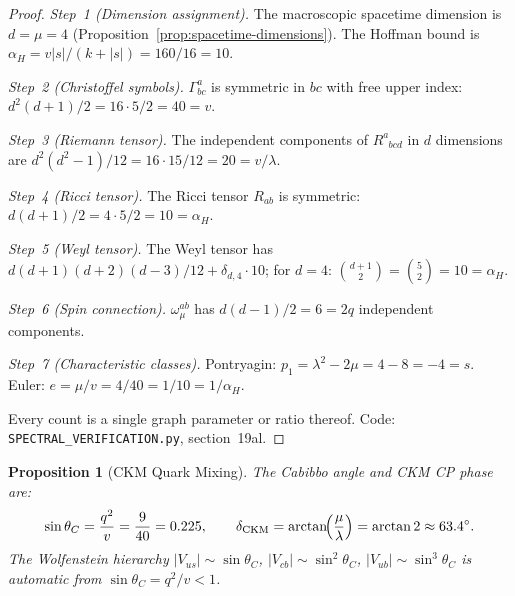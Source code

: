 \documentclass[12pt,a4paper]{article}
\newtheorem{proposition}[theorem]{Proposition}
\begin{document}
\begin{proof}
\emph{Step~1 (Dimension assignment).}
The macroscopic spacetime dimension is $d = \mu = 4$
(Proposition~\ref{prop:spacetime-dimensions}).
The Hoffman bound is $\alpha_H = v|s|/(k+|s|) = 160/16 = 10$.

\emph{Step~2 (Christoffel symbols).}
$\Gamma^a_{bc}$ is symmetric in $bc$ with free upper index:
$d^2(d+1)/2 = 16 \cdot 5/2 = 40 = v$.

\emph{Step~3 (Riemann tensor).}
The independent components of $R^a_{\phantom{a}bcd}$ in $d$ dimensions
are $d^2(d^2-1)/12 = 16 \cdot 15/12 = 20 = v/\lambda$.

\emph{Step~4 (Ricci tensor).}
The Ricci tensor $R_{ab}$ is symmetric:
$d(d+1)/2 = 4 \cdot 5/2 = 10 = \alpha_H$.

\emph{Step~5 (Weyl tensor).}
The Weyl tensor has $d(d+1)(d+2)(d-3)/12 + \delta_{d,4}\cdot 10$;
for $d=4$: $\binom{d+1}{2} = \binom{5}{2} = 10 = \alpha_H$.

\emph{Step~6 (Spin connection).}
$\omega^{ab}_\mu$ has $d(d-1)/2 = 6 = 2q$ independent components.

\emph{Step~7 (Characteristic classes).}
Pontryagin: $p_1 = \lambda^2 - 2\mu = 4 - 8 = -4 = s$.
Euler: $e = \mu/v = 4/40 = 1/10 = 1/\alpha_H$.

Every count is a single graph parameter or ratio thereof.
Code: \texttt{SPECTRAL\_VERIFICATION.py}, section~19al.
\end{proof}


\begin{proposition}[CKM Quark Mixing]\label{prop:ckm}
The Cabibbo angle and CKM CP phase are:
\[
  \sin\theta_C = \frac{q^2}{v} = \frac{9}{40} = 0.225,
  \qquad
  \delta_{\mathrm{CKM}} = \arctan\!\Bigl(\frac{\mu}{\lambda}\Bigr)
    = \arctan 2 \approx 63.4^\circ.
\]
The Wolfenstein hierarchy
$|V_{us}| \sim \sin\theta_C$,
$|V_{cb}| \sim \sin^2\theta_C$,
$|V_{ub}| \sim \sin^3\theta_C$
is automatic from $\sin\theta_C = q^2/v < 1$.
\end{proposition}
\end{document}
